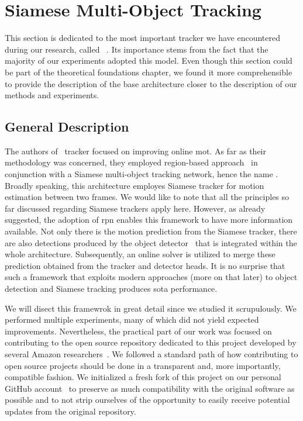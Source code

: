 \section{Siamese Multi-Object Tracking}
\label{sec:SiamMOT}

This section is dedicated to the most important tracker we have encountered during our research, called \siammot{}~\cite{shuai2021siammot}. Its importance stems from the fact that the majority of our experiments adopted this model. Even though this section could be part of the theoretical foundations chapter, we found it more comprehensible to provide the description of the base architecture closer to the description of our methods and experiments.

\subsection{General Description}

The authors of~\cite{shuai2021siammot} tracker focused on improving online \gls{mot}. As far as their methodology was concerned, they employed region-based approach~\cite{ren2017fasterrcnn} in conjunction with a Siamese multi-object tracking network, hence the name \siammot{}. Broadly speaking, this architecture employes Siamese tracker for motion estimation between two frames. We would like to note that all the principles so far discussed regarding Siamese trackers apply here. However, as already suggested, the adoption of \gls{rpn} enables this framework to have more information available. Not only there is the motion prediction from the Siamese tracker, there are also detections produced by the  object detector~\cite{ren2017fasterrcnn} that is integrated within the whole architecture. Subsequently, an online solver is utilized to merge these prediction obtained from the tracker and detector heads. It is no surprise that such a framework that exploits modern approaches (more on that later) to object detection and Siamese tracking produces \gls{sota} performance.

We will disect this framewrok in great detail since we studied it scrupulously. We performed multiple experiments, many of which did not yield expected improvements. Nevertheless, the practical part of our work was focused on contributing to the open source repository dedicated to this project developed by several Amazon researchers~\cite{websiammotoriggithub}. We followed a standard path of how contributing to open source projects should be done in a transparent and, more importantly, compatible fashion. We initialized a fresh fork of this project on our personal GitHub account~\cite{websiammotforkgithub} to preserve as much compatibility with the original software as possible and to not strip ourselves of the opportunity to easily receive potential updates from the original repository.

